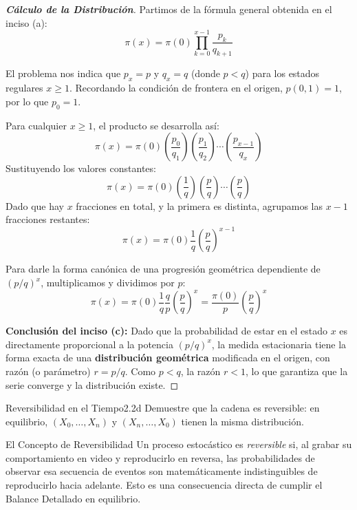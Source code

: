 \documentclass[10pt,a4paper]{article}
\begin{document}
\begin{proof}[\textbf{Cálculo de la Distribución}]
    Partimos de la fórmula general obtenida en el inciso (a):
    \[ \pi(x) = \pi(0) \prod_{k=0}^{x-1} \frac{p_k}{q_{k+1}} \]
    
    El problema nos indica que $p_x = p$ y $q_x = q$ (donde $p < q$) para los estados regulares $x \ge 1$. Recordando la condición de frontera en el origen, $p(0,1) = 1$, por lo que $p_0 = 1$.
    
    Para cualquier $x \ge 1$, el producto se desarrolla así:
    \[ \pi(x) = \pi(0) \left( \frac{p_0}{q_1} \right) \left( \frac{p_1}{q_2} \right) \cdots \left( \frac{p_{x-1}}{q_x} \right) \]
    Sustituyendo los valores constantes:
    \[ \pi(x) = \pi(0) \left( \frac{1}{q} \right) \left( \frac{p}{q} \right) \cdots \left( \frac{p}{q} \right) \]
    Dado que hay $x$ fracciones en total, y la primera es distinta, agrupamos las $x-1$ fracciones restantes:
    \[ \pi(x) = \pi(0) \frac{1}{q} \left(\frac{p}{q}\right)^{x-1} \]
    
    Para darle la forma canónica de una progresión geométrica dependiente de $(p/q)^x$, multiplicamos y dividimos por $p$:
    \[ \pi(x) = \pi(0) \frac{1}{q} \frac{q}{p} \left(\frac{p}{q}\right)^x = \frac{\pi(0)}{p} \left(\frac{p}{q}\right)^x \]
    
    \textbf{Conclusión del inciso (c):}
    Dado que la probabilidad de estar en el estado $x$ es directamente proporcional a la potencia $(p/q)^x$, la medida estacionaria tiene la forma exacta de una \textbf{distribución geométrica} modificada en el origen, con razón (o parámetro) $r = p/q$. Como $p < q$, la razón $r < 1$, lo que garantiza que la serie converge y la distribución existe.
\end{proof}

\vspace{5mm}

\begin{ejercicio}{Reversibilidad en el Tiempo}{2.2d}
    Demuestre que la cadena es reversible: en equilibrio, $(X_0, \dots, X_n)$ y $(X_n, \dots, X_0)$ tienen la misma distribución.
\end{ejercicio}

\vspace{2mm}

\begin{nota}{El Concepto de Reversibilidad}
    Un proceso estocástico es \textit{reversible} si, al grabar su comportamiento en video y reproducirlo en reversa, las probabilidades de observar esa secuencia de eventos son matemáticamente indistinguibles de reproducirlo hacia adelante. Esto es una consecuencia directa de cumplir el Balance Detallado en equilibrio.
\end{nota}
\end{document}
